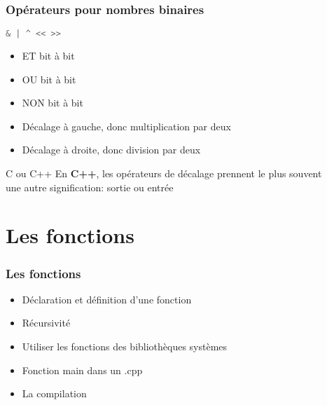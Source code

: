\documentclass{beamer}
\begin{document}
\begin{frame}[fragile=singleslide,shrink=20]
\frametitle{Opérateurs pour nombres binaires}
\begin{lstlisting}[language=c++]
& | ^ << >>
\end{lstlisting}
\begin{itemize}
\item{ET bit à bit}
\item{OU bit à bit}
\item{NON bit à bit}
\item{Décalage à gauche, donc multiplication par deux}
\item{Décalage à droite, donc division par deux}
\end{itemize}
\begin{block}{C ou C++}
En \textbf{C++}, les opérateurs de décalage prennent le plus souvent \\ 
une autre signification: sortie ou entrée
\end{block}
\end{frame}

\section{Les fonctions}


\begin{frame}[fragile=singleslide,shrink=20]
\frametitle{Les fonctions}

\begin{itemize}
\item{Déclaration et définition d'une fonction}
\item{Récursivité}
\item{Utiliser les fonctions des bibliothèques systèmes}
\item{Fonction main dans un .cpp}
\item{La compilation}
\end{itemize}
\end{frame}
\end{document}
